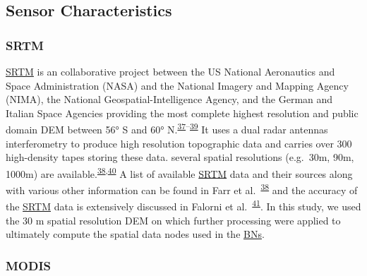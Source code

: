 \documentclass[12pt,oneside]{article}
\begin{document}
\hypertarget{I2}{%
\subsection{Sensor Characteristics}\label{I2}}

\hypertarget{I21}{%
\subsubsection{SRTM}\label{I21}}

\href{https://www2.jpl.nasa.gov/srtm/}{SRTM} is an collaborative project between the US National Aeronautics and Space Administration (NASA) and the National Imagery and Mapping Agency (NIMA), the National Geospatial-Intelligence Agency, and the German and Italian Space Agencies providing the most complete highest resolution and public domain DEM between 56° S and 60° N.\textsuperscript{\protect\hyperlink{ref-Farr_et_al_2000}{37}--\protect\hyperlink{ref-Nikolakopoulos_et_al_2006}{39}} It uses a dual radar antennas interferometry to produce high resolution topographic data and carries over 300 high-density tapes storing these data. several spatial resolutions (e.g.~30m, 90m, 1000m) are available.\textsuperscript{\protect\hyperlink{ref-Farr_et_al_2007}{38},\protect\hyperlink{ref-Jarvis_et_al_2008}{40}} A list of available \href{https://www2.jpl.nasa.gov/srtm/}{SRTM} data and their sources along with various other information can be found in Farr et al.~\textsuperscript{\protect\hyperlink{ref-Farr_et_al_2007}{38}} and the accuracy of the \href{https://www2.jpl.nasa.gov/srtm/}{SRTM} data is extensively discussed in Falorni et al.~\textsuperscript{\protect\hyperlink{ref-Falorni_et_al_2005}{41}}. In this study, we used the 30 m spatial resolution DEM on which further processing were applied to ultimately compute the spatial data nodes used in the \href{https://en.wikipedia.org/wiki/Bayesian_network}{BNs}.

\hypertarget{I22}{%
\subsubsection{MODIS}\label{I22}}
\end{document}
